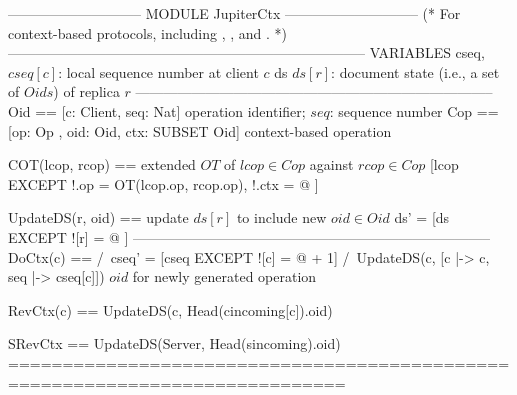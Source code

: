 \documentclass{article}
\begin{document}
\begin{tla}
----------------------------- MODULE JupiterCtx -----------------------------
(*
For context-based \jupiter{} protocols, including \absjupiter{}, \cjupiter{}, and \xjupiter{}.
*)
-----------------------------------------------------------------------------
VARIABLES cseq, \* $cseq[c]$: local sequence number at client $c$
          ds    \* $ds[r]$: document state (i.e., a set of $Oids$) of replica $r$
-----------------------------------------------------------------------------
Oid == [c: Client, seq: Nat] \* operation identifier; $seq$: sequence number
Cop == [op: Op , oid: Oid, ctx: SUBSET Oid] \* context-based operation

COT(lcop, rcop) == \* extended $OT$ of $lcop \in Cop$ against $rcop \in Cop$
    [lcop EXCEPT !.op = OT(lcop.op, rcop.op), !.ctx = @ ]

UpdateDS(r, oid) == \* update $ds[r]$ to include new $oid \in Oid$
    ds' = [ds EXCEPT ![r] = @ ]
-----------------------------------------------------------------------------
DoCtx(c) == 
    /\ cseq' = [cseq EXCEPT ![c] = @ + 1]
    /\ UpdateDS(c, [c |-> c, seq |-> cseq[c]]) \* $oid$ for newly generated operation

RevCtx(c) == UpdateDS(c, Head(cincoming[c]).oid)
    
SRevCtx == UpdateDS(Server, Head(sincoming).oid)
=============================================================================
\end{tla}
\end{document}

